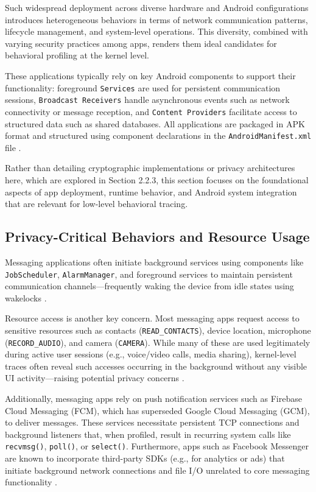 \documentclass[a4paper,12pt]{report}
\begin{document}
Such widespread deployment across diverse hardware and Android configurations introduces heterogeneous behaviors in terms of network communication patterns, lifecycle management, and system-level operations. This diversity, combined with varying security practices among apps, renders them ideal candidates for behavioral profiling at the kernel level.

These applications typically rely on key Android components to support their functionality: foreground \texttt{Services} are used for persistent communication sessions, \texttt{Broadcast Receivers} handle asynchronous events such as network connectivity or message reception, and \texttt{Content Providers} facilitate access to structured data such as shared databases. All applications are packaged in APK format and structured using component declarations in the \texttt{AndroidManifest.xml} file \cite{AOSPArchOverview}.

Rather than detailing cryptographic implementations or privacy architectures here, which are explored in Section 2.2.3, this section focuses on the foundational aspects of app deployment, runtime behavior, and Android system integration that are relevant for low-level behavioral tracing.

\subsection{Privacy-Critical Behaviors and Resource Usage}
Messaging applications often initiate background services using components like \\
\texttt{JobScheduler}, \texttt{AlarmManager}, and foreground services to maintain persistent communication channels—frequently waking the device from idle states using wakelocks \cite{AOSPWakelocks}.

Resource access is another key concern. Most messaging apps request access to sensitive resources such as contacts (\texttt{READ\_CONTACTS}), device location, microphone (\texttt{RECORD\_AUDIO}), and camera (\texttt{CAMERA}). While many of these are used legitimately during active user sessions (e.g., voice/video calls, media sharing), kernel-level traces often reveal such accesses occurring in the background without any visible UI activity—raising potential privacy concerns \cite{enck2014taintdroid}.

Additionally, messaging apps rely on push notification services such as Firebase Cloud Messaging (FCM), which has superseded Google Cloud Messaging (GCM), to deliver messages. These services necessitate persistent TCP connections and background listeners that, when profiled, result in recurring system calls like \texttt{recvmsg()}, \texttt{poll()}, or \texttt{select()}. Furthermore, apps such as Facebook Messenger are known to incorporate third-party SDKs (e.g., for analytics or ads) that initiate background network connections and file I/O unrelated to core messaging functionality \cite{ShenVervierStringhini2021}.
\end{document}
